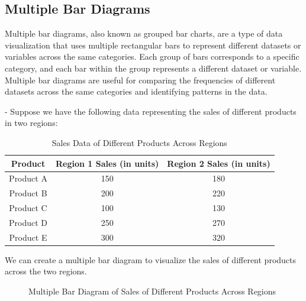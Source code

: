 \documentclass[openany]{book}
\begin{document}
\subsection{Multiple Bar Diagrams}
Multiple bar diagrams, also known as grouped bar charts, are a type of data visualization that uses multiple rectangular bars to represent different datasets or variables across the same categories. Each group of bars corresponds to a specific category, and each bar within the group represents a different dataset or variable. Multiple bar diagrams are useful for comparing the frequencies of different datasets across the same categories and identifying patterns in the data. \\
\begin{example}
 - Suppose we have the following data representing the sales of different products in two regions:
\begin{table}[H]
    \centering
    \begin{tabular}{|c|c|c|}
        \hline
        \textbf{Product} & \textbf{Region 1 Sales (in units)} & \textbf{Region 2 Sales (in units)} \\
        \hline
        Product A & 150 & 180 \\
        Product B & 200 & 220 \\
        Product C & 100 & 130 \\
        Product D & 250 & 270 \\
        Product E & 300 & 320 \\
        \hline
    \end{tabular}
    \caption{Sales Data of Different Products Across Regions}
\end{table}
We can create a multiple bar diagram to visualize the sales of different products across the two regions. \\
\begin{figure}[H]
    \centering
    \caption{Multiple Bar Diagram of Sales of Different Products Across Regions}
\end{figure}
\end{example}
\end{document}
